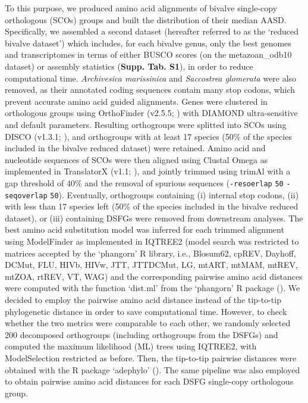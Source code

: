 \documentclass[../main.tex]{subfiles}
\begin{document}
To this purpose, we produced amino acid alignments of bivalve single-copy orthologous (SCOs) groups and built the distribution of their median AASD. Specifically, we assembled a second dataset (hereafter referred to as the ‘reduced bivalve dataset’) which includes, for each bivalve genus, only the best genomes and transcriptomes in terms of either BUSCO scores (on the metazoan\_odb10 dataset) or assembly statistics (\textbf{Supp. Tab. S1}), in order to reduce computational time. \textit{Archivesica marissinica} and \textit{Saccostrea glomerata} were also removed, as their annotated coding sequences contain many stop codons, which prevent accurate amino acid guided alignments. Genes were clustered in orthologous groups using OrthoFinder (v2.5.5; \textbf{\cite{emms2019orthofinder}}) with DIAMOND ultra-sensitive and default parameters. Resulting orthogroups were splitted into SCOs using DISCO (v1.3.1; \textbf{\cite{willson2022disco}}), and orthogroups with at least 17 species (50\% of the species included in the bivalve reduced dataset) were retained. Amino acid and nucleotide sequences of SCOs were then aligned using Clustal Omega as implemented in TranslatorX (v1.1; \textbf{\cite{abascal2010translatorx}}), and jointly trimmed using trimAl with a gap threshold of 40\% and the removal of spurious sequences (\verb|-resoerlap| \verb|50| \verb|-seqoverlap| \verb|50|). Eventually, orthogroups containing (i) internal stop codons, (ii) with less than 17 species left (50\% of the species included in the bivalve reduced dataset), or (iii) containing DSFGs were removed from downstream analyses. The best amino acid substitution model was inferred for each trimmed alignment using ModelFinder as implemented in IQTREE2 (model search was restricted to matrices accepted by the ‘phangorn’ R library, i.e., Blosum62, cpREV, Dayhoff, DCMut, FLU, HIVb, HIVw, JTT, JTTDCMut, LG, mtART, mtMAM, mtREV, mtZOA, rtREV, VT, WAG) and the corresponding pairwise amino acid distances were computed with the function ‘dist.ml’ from the ‘phangorn’ R package (\textbf{\cite{schliep2011phangorn}}). We decided to employ the pairwise amino acid distance instead of the tip-to-tip phylogenetic distance in order to save computational time. However, to check whether the two metrics were comparable to each other, we randomly selected 200 decomposed orthogroups (including orthogroups from the DSFGs) and computed the maximum likelihood (ML) trees using IQTREE2, with ModelSelection restricted as before. Then, the tip-to-tip pairwise distances were obtained with the R package ‘adephylo’ (\textbf{\cite{jombart2010adephylo}}). The same pipeline was also employed to obtain pairwise amino acid distances for each DSFG single-copy orthologous group.
\end{document}
